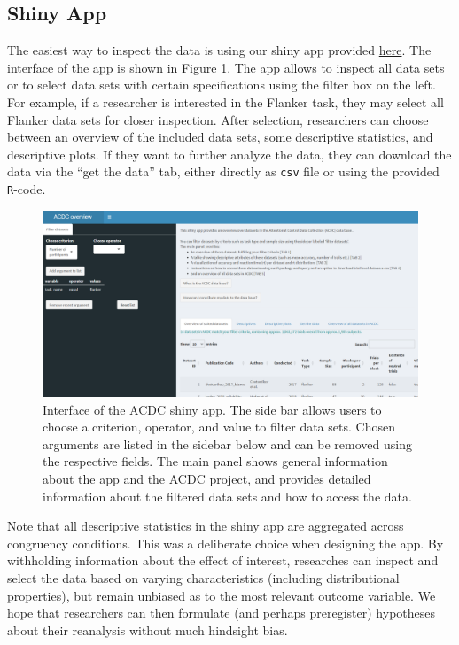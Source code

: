 \documentclass[
  man,floatsintext]{apa6}
\begin{document}
\hypertarget{shiny-app}{%
\subsection{Shiny App}\label{shiny-app}}

The easiest way to inspect the data is using our shiny app provided \href{https://mfhcgn.shinyapps.io/acdc-database/}{here}. The interface of the app is shown in Figure \ref{fig:figure3}. The app allows to inspect all data sets or to select data sets with certain specifications using the filter box on the left. For example, if a researcher is interested in the Flanker task, they may select all Flanker data sets for closer inspection. After selection, researchers can choose between an overview of the included data sets, some descriptive statistics, and descriptive plots. If they want to further analyze the data, they can download the data via the ``get the data'' tab, either directly as \texttt{csv} file or using the provided \texttt{R}-code.



\begin{figure}
\centering
\includegraphics{images/Shiny_interface.png}
\caption{\label{fig:figure3}Interface of the ACDC shiny app. The side bar allows users to choose a criterion, operator, and value to filter data sets. Chosen arguments are listed in the sidebar below and can be removed using the respective fields. The main panel shows general information about the app and the ACDC project, and provides detailed information about the filtered data sets and how to access the data.}
\end{figure}

Note that all descriptive statistics in the shiny app are aggregated across congruency conditions. This was a deliberate choice when designing the app. By withholding information about the effect of interest, researches can inspect and select the data based on varying characteristics (including distributional properties), but remain unbiased as to the most relevant outcome variable. We hope that researchers can then formulate (and perhaps preregister) hypotheses about their reanalysis without much hindsight bias.
\end{document}
